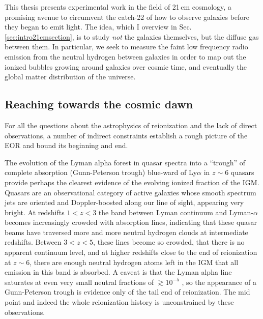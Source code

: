 This thesis presents experimental work in the field of 21\,cm cosmology, a promising avenue to circumvent the catch-22 of how to observe galaxies before they began to emit light. The idea, which I overview in Sec. \ref{sec:intro21cmsection}, is to study \textit{not} the galaxies themselves, but the diffuse gas between them. In particular, we seek to measure the faint low frequency radio emission from the neutral hydrogen between galaxies in order to map out the ionized bubbles growing around galaxies over cosmic time, and eventually the global matter distribution of the universe. 


\subsection{Reaching towards the cosmic dawn}

For all the questions about the astrophysics of reionization and the lack of direct observations, a number of indirect constraints establish a rough picture of the EOR and bound its beginning and end. 

The evolution of the Lyman alpha forest in quasar spectra into a ``trough'' of complete absorption (Gunn-Peterson trough) blue-ward of Ly$\alpha$ in $z\sim6$ quasars provide perhaps the clearest evidence of the evolving ionized fraction of the IGM. Quasars are an observational category of active galaxies whose smooth spectrum jets are oriented and Doppler-boosted along our line of sight, appearing very bright. At redshifts $1<z<3$ the band between Lyman continuum and Lyman-$\alpha$ becomes increasingly crowded with absorption lines, indicating that these quasar beams have traversed more and more neutral hydrogen clouds at intermediate redshifts. Between $3<z<5$, these lines become so crowded, that there is no apparent continuum level, and at higher redshifts close to the end of reionization at $z\sim6$, there are enough neutral hydrogen atoms left in the IGM that all emission in this band is absorbed. A caveat is that the Lyman alpha line saturates at even very small neutral fractions of $\gtrsim 10^{-5}$ \citep{FurlanettoReview}, so the appearance of a Gunn-Peterson trough is evidence only of the tail end of reionization. The mid point and indeed the whole reionization history is unconstrained by these observations.

